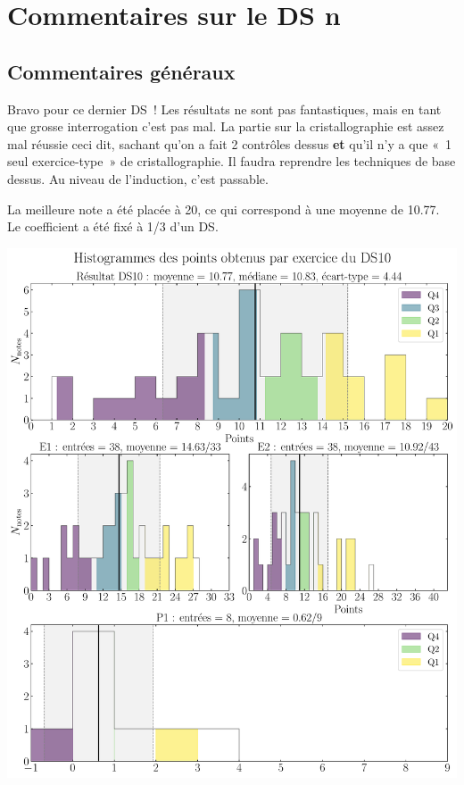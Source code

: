 \documentclass[a4paper, 10pt, final, garamond]{book}
\begin{document}
\setcounter{chapter}{9}

\def\lspace{25}

\chapter{Commentaires sur le DS n\degree\thechapter}
\section{Commentaires généraux}

Bravo pour ce dernier DS~! Les résultats ne sont pas fantastiques, mais en tant
que grosse interrogation c'est pas mal. La partie sur la cristallographie est
assez mal réussie ceci dit, sachant qu'on a fait 2 contrôles dessus \textbf{et}
qu'il n'y a que «~1 seul exercice-type~» de cristallographie. Il faudra
reprendre les techniques de base dessus. Au niveau de l'induction, c'est
passable.

La meilleure note a été placée à 20, ce qui correspond à une moyenne de
\num{10.77}. Le coefficient a été fixé à 1/3 d'un DS.

\begin{center}
	\includegraphics[width=.87\linewidth]{DS10_hist_all}
\end{center}
\end{document}
